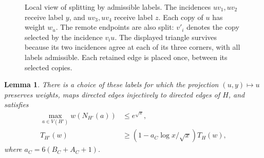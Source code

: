 \documentclass[11pt]{article}
\newtheorem{lemma}[theorem]{Lemma}
\theoremstyle{definition}
\theoremstyle{remark}
\numberwithin{equation}{section}
\begin{document}
\begin{figure}[htbp]
  \endgroup
  \caption{Local view of splitting by admissible labels. The incidences
    $uv_1,uv_2$ receive label $y$, and $uv_3,uv_4$ receive label $z$.
    Each copy of $u$ has weight $w_u$. The remote endpoints are also split:
    $v'_i$ denotes the copy selected by the incidence $v_i u$.
    The displayed triangle survives because its two incidences agree at
    each of its three corners, with all labels admissible. Each retained
    edge is placed once, between its selected copies.}
  \label{fig:label-splitting}
\end{figure}


\begin{lemma}\label{lem:weighted-splitting}
There is a choice of these labels for which the projection
$(u,y)\mapsto u$ preserves weights, maps directed edges injectively
to directed edges of $H$, and satisfies
\begin{align}
 \max_{a\in V(H')}w(N_{H'}(a))&\le e^{\sqrt x},
 \label{eq:split-neighborhood}\\
 T_{H'}(w)&\ge(1-a_C\log x/\sqrt x)T_H(w),
 \label{eq:split-triangles}
\end{align}
where $a_C=6(B_C+A_C+1)$.
\end{lemma}
\end{document}
